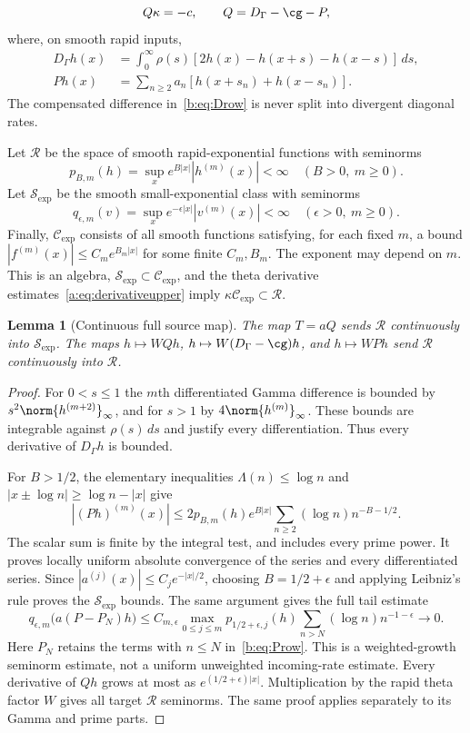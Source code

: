 \documentclass[11pt,a4paper]{article}
\numberwithin{equation}{section}
\newtheorem{lemma}[theorem]{Lemma}
\theoremstyle{definition}\newtheorem{definition}[theorem]{Definition}
\theoremstyle{remark}\newtheorem{remark}[theorem]{Remark}
\newcommand{\RR}{\mathscr R}\newcommand{\SSS}{\mathcal S_{\!\exp}}\newcommand{\CE}{\mathcal C_{\exp}}
\begin{document}
\begin{equation}\label{b:eq:source-main}
 Q\kappa=-c,\qquad Q=D_\Gamma-\cg-P,
\end{equation}
where, on smooth rapid inputs,
\begin{align}
 D_\Gamma h(x)&=\int_0^\infty\rho(s)
       [2h(x)-h(x+s)-h(x-s)]\,ds,\label{b:eq:Drow}\\
 Ph(x)&=\sum_{n\ge2}a_n[h(x+s_n)+h(x-s_n)].\label{b:eq:Prow}
\end{align}
The compensated difference in~\eqref{b:eq:Drow} is never split into divergent diagonal rates.

Let $\RR$ be the space of smooth rapid-exponential functions with seminorms
\[
 p_{B,m}(h)=\sup_x e^{B|x|}|h^{(m)}(x)|<\infty
 \quad(B>0,\ m\ge0).
\]
Let $\SSS$ be the smooth small-exponential class with seminorms
\[
 q_{\epsilon,m}(v)=\sup_xe^{-\epsilon|x|}|v^{(m)}(x)|<\infty
 \quad(\epsilon>0,\ m\ge0).
\]
Finally, $\CE$ consists of all smooth functions satisfying, for each fixed $m$, a bound $|f^{(m)}(x)|\le C_m e^{B_m|x|}$ for some finite $C_m,B_m$. The exponent may depend on $m$. This is an algebra, $\SSS\subset\CE$, and the theta derivative estimates~\eqref{a:eq:derivativeupper} imply $\kappa\CE\subset\RR$.

\begin{lemma}[Continuous full source map]\label{b:lem:T}
The map $T=aQ$ sends $\RR$ continuously into $\SSS$. The maps $h\mapsto WQh$, $h\mapsto W(D_\Gamma-\cg)h$, and $h\mapsto WPh$ send $\RR$ continuously into $\RR$.
\end{lemma}
\begin{proof}
For $0<s\le1$ the $m$th differentiated Gamma difference is bounded by $s^2\norm{h^{(m+2)}}_\infty$, and for $s>1$ by $4\norm{h^{(m)}}_\infty$. These bounds are integrable against $\rho(s)\,ds$ and justify every differentiation. Thus every derivative of $D_\Gamma h$ is bounded.

For $B>1/2$, the elementary inequalities $\Lambda(n)\le\log n$ and $|x\pm\log n|\ge\log n-|x|$ give
\begin{equation}\label{b:eq:primepoint}
 |(Ph)^{(m)}(x)|\le
  2p_{B,m}(h)e^{B|x|}\sum_{n\ge2}(\log n)n^{-B-1/2}.
\end{equation}
The scalar sum is finite by the integral test, and includes every prime power. It proves locally uniform absolute convergence of the series and every differentiated series. Since $|a^{(j)}(x)|\le C_j e^{-|x|/2}$, choosing $B=1/2+\epsilon$ and applying Leibniz's rule proves the $\SSS$ bounds. The same argument gives the full tail estimate
\begin{equation}\label{b:eq:primetailpoint}
 q_{\epsilon,m}\bigl(a(P-P_N)h\bigr)
 \le C_{m,\epsilon}\max_{0\le j\le m}p_{1/2+\epsilon,j}(h)
           \sum_{n>N}(\log n)n^{-1-\epsilon}\longrightarrow0.
\end{equation}
Here $P_N$ retains the terms with $n\le N$ in~\eqref{b:eq:Prow}. This is a weighted-growth seminorm estimate, not a uniform unweighted incoming-rate estimate. Every derivative of $Qh$ grows at most as $e^{(1/2+\epsilon)|x|}$. Multiplication by the rapid theta factor $W$ gives all target $\RR$ seminorms. The same proof applies separately to its Gamma and prime parts.
\end{proof}
\end{document}
